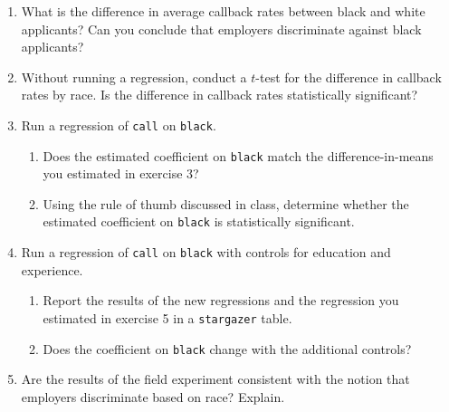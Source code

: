 \documentclass[11pt]{article}
\begin{document}
\begin{onehalfspacing}
\begin{enumerate}
\item What is the difference in average callback rates between black and white applicants? Can you conclude that employers discriminate against black applicants?

\item Without running a regression, conduct a $t$-test for the difference in callback rates by race. Is the difference in callback rates statistically significant?

\item Run a regression of \texttt{call} on \texttt{black}. 
\begin{enumerate}
	\item Does the estimated coefficient on \texttt{black} match the difference-in-means you estimated in exercise 3?
	\item Using the rule of thumb discussed in class, determine whether the estimated coefficient on \texttt{black} is statistically significant.
\end{enumerate}

\item Run a regression of \texttt{call} on \texttt{black} with controls for education and experience. 
\begin{enumerate}

	\item Report the results of the new regressions and the regression you estimated in exercise 5 in a \texttt{stargazer} table.
	\item Does the coefficient on \texttt{black} change with the additional controls? 
\end{enumerate}

\item Are the results of the field experiment consistent with the notion that employers discriminate based on race? Explain.

\end{enumerate}
\end{onehalfspacing}
\end{document}
